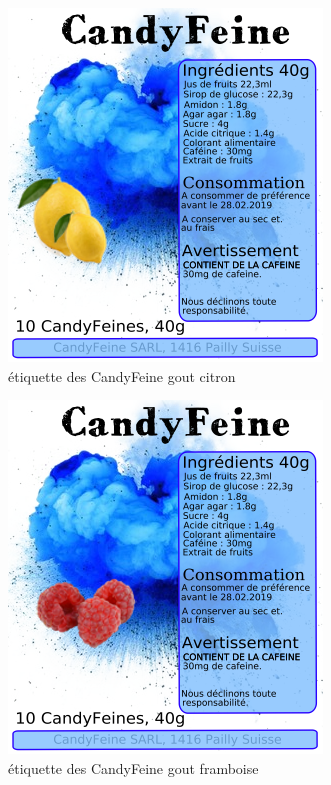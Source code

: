 \documentclass[12pt]{article}
\begin{document}
\begin{figure}[H]
\centering
   \caption{\label{étiquette} étiquette des CandyFeine gout citron}
   \includegraphics[scale=0.8]{../img/designEtiquettes_Citron.png}
\end{figure}

\begin{figure}[H]
\centering
   \caption{\label{étiquette} étiquette des CandyFeine gout framboise}
   \includegraphics[scale=0.8]{../img/designEtiquettes_Framboise.png}
\end{figure}
\end{document}
